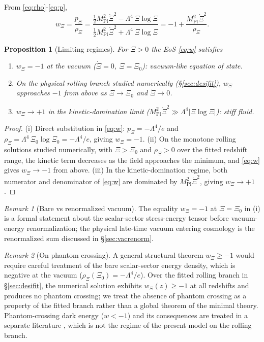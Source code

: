 \documentclass[11pt,reqno]{amsart}
\theoremstyle{plain}
\newtheorem{proposition}[theorem]{Proposition}
\theoremstyle{definition}
\theoremstyle{remark}
\newtheorem*{remark}{Remark}
\newcommand{\Pl}{\mathrm{Pl}}
\begin{document}
From \eqref{eq:rho}-\eqref{eq:p},
\begin{equation}\label{eq:w}
  w_\Xi = \frac{p_\Xi}{\rho_\Xi}
  = \frac{\tfrac{1}{2} M_\Pl^{2}\dot\Xi^{2} - \Lambda^{4}\,\Xi\log\Xi}
         {\tfrac{1}{2} M_\Pl^{2}\dot\Xi^{2} + \Lambda^{4}\,\Xi\log\Xi}
  = -1 + \frac{M_\Pl^{2}\dot\Xi^{2}}{\rho_\Xi}.
\end{equation}

\begin{proposition}[Limiting regimes]\label{prop:limits}
For $\Xi > 0$ the EoS \eqref{eq:w} satisfies
\begin{enumerate}
  \item[(i)] $w_\Xi = -1$ at the vacuum ($\dot\Xi = 0$, $\Xi = \Xi_0$):
        vacuum-like equation of state.
  \item[(ii)] On the physical rolling branch studied numerically
        (\S\ref{sec:desifit}), $w_\Xi$ approaches $-1$ from above as
        $\Xi \to \Xi_0$ and $\dot\Xi \to 0$.
  \item[(iii)] $w_\Xi \to +1$ in the kinetic-domination limit
        ($M_\Pl^{2}\dot\Xi^{2} \gg \Lambda^{4}|\Xi\log\Xi|$): stiff fluid.
\end{enumerate}
\end{proposition}

\begin{proof}
(i) Direct substitution in \eqref{eq:w}: $p_\Xi = -\Lambda^{4}/e$ and
$\rho_\Xi = \Lambda^{4}\,\Xi_0 \log\Xi_0 = -\Lambda^{4}/e$, giving
$w_\Xi = -1$. (ii) On the monotone rolling solutions studied numerically,
with $\Xi > \Xi_0$ and $\rho_\Xi > 0$ over the fitted redshift range, the
kinetic term decreases as the field approaches the minimum, and
\eqref{eq:w} gives $w_\Xi \to -1$ from above.
(iii) In the kinetic-domination regime, both numerator and denominator
of \eqref{eq:w} are dominated by $M_\Pl^{2}\dot\Xi^{2}$, giving
$w_\Xi \to +1$.
\end{proof}

\begin{remark}[Bare vs renormalized vacuum]
The equality $w_\Xi = -1$ at $\Xi = \Xi_0$ in (i) is a formal statement
about the scalar-sector stress-energy tensor before vacuum-energy
renormalization; the physical late-time vacuum entering cosmology is the
renormalized sum discussed in \S\ref{sec:vacrenorm}.
\end{remark}

\begin{remark}[On phantom crossing]
A general structural theorem $w_\Xi \geq -1$ would require careful
treatment of the bare scalar-sector energy density, which is negative
at the vacuum ($\rho_\Xi(\Xi_0) = -\Lambda^4/e$). Over the fitted
rolling branch in \S\ref{sec:desifit}, the numerical solution exhibits
$w_\Xi(z) \geq -1$ at all redshifts and produces no phantom crossing;
we treat the absence of phantom crossing as a property of the fitted
branch rather than a global theorem of the minimal theory.
Phantom-crossing dark energy ($w < -1$) and its consequences are
treated in a separate literature \cite{Caldwell2002Phantom}, which is
not the regime of the present model on the rolling branch.
\end{remark}
\end{document}
